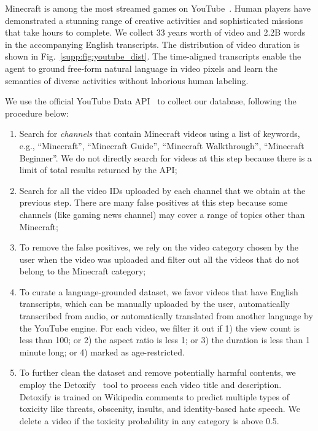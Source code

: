 Minecraft is among the most streamed games on YouTube~\cite{gerblick_2021}. Human players have demonstrated a stunning range of creative activities and sophisticated missions that take hours to complete. We collect 33 years worth of video and 2.2B words in the accompanying English transcripts. The distribution of video duration is shown in Fig.~\ref{supp:fig:youtube_dist}.
The time-aligned transcripts enable the agent to ground free-form natural language in video pixels and learn the semantics of diverse activities without laborious human labeling.

We use the official YouTube Data API~\cite{youtubeapi} to collect our database, following the procedure below:
\begin{enumerate}[label=\alph*)]
    \item Search for \textit{channels} that contain Minecraft videos using a list of keywords, e.g., ``Minecraft'', ``Minecraft Guide'', ``Minecraft Walkthrough'', ``Minecraft Beginner''. We do not directly search for videos at this step because there is a limit of total results returned by the API;
    \item Search for all the video IDs uploaded by each channel that we obtain at the previous step. There are many false positives at this step because some channels (like gaming news channel) may cover a range of topics other than Minecraft;
    \item To remove the false positives, we rely on the video category chosen by the user when the video was uploaded and filter out all the videos that do not belong to the Minecraft category;
    \item To curate a language-grounded dataset, we favor videos that have English transcripts, which can be manually uploaded by the user, automatically transcribed from audio, or automatically translated from another language by the YouTube engine. For each video, we filter it out if 1) the view count is less than 100; or 2) the aspect ratio is less 1; or 3) the duration is less than 1 minute long; or 4) marked as age-restricted.
    \item To further clean the dataset and remove potentially harmful contents, we employ the Detoxify~\cite{detoxify} tool to process each video title and description. Detoxify is trained on Wikipedia comments to predict multiple types of toxicity like threats, obscenity, insults, and identity-based hate speech. We delete a video if the toxicity probability in any category is above 0.5.
\end{enumerate}


